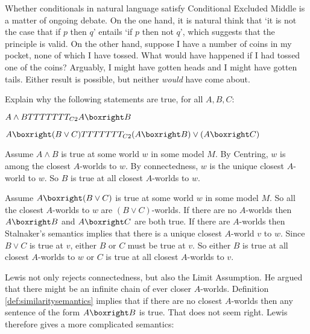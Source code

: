Whether conditionals in natural language satisfy Conditional Excluded Middle is
a matter of ongoing debate. On the one hand, it is natural think that `it is not
the case that if $p$ then $q$' entails `if $p$ then not $q$', which suggests
that the principle is valid. On the other hand, suppose I have a number of coins
in my pocket, none of which I have tossed. What would have happened if I had
tossed one of the coins? Arguably, I might have gotten heads and I might have
gotten tails. Either result is possible, but neither \emph{would} have come
about.

\begin{exercise}
  Explain why the following statements are true, for all $A,B,C$:
  \begin{exlist}
  \item $A \land B \models_{C2} A \boxright B$
  \item $A \boxright (B\lor C) \models_{C2} (A \boxright B) \lor (A \boxright C)$
  \end{exlist}
\end{exercise}
\begin{solution}
  \begin{sollist}
    \item Assume $A\land B$ is true at some world $w$ in some model $M$. By
    Centring, $w$ is among the closest $A$-worlds to $w$. By connectedness, $w$
    is the unique closest $A$-world to $w$. So $B$ is true at all closest
    $A$-worlds to $w$.
    \item Assume $A \boxright (B\lor C)$ is true at some world $w$ in some model
    $M$. So all the closest $A$-worlds to $w$ are $(B\lor C)$-worlds. If there
    are no $A$-worlds then $A \boxright B$ and $A \boxright C$ are both true. If
    there are $A$-worlds then Stalnaker's semantics implies that there is a
    unique closest $A$-world $v$ to $w$. Since $B\lor C$ is true at $v$, either $B$ or $C$ must be true at $v$. So either $B$ is true at all closest $A$-worlds to $w$ or $C$ is true at all closest $A$-worlds to $v$.
  \end{sollist}
\end{solution}

Lewis not only rejects connectedness, but also the Limit Assumption. He argued
that there might be an infinite chain of ever closer $A$-worlds. Definition
\ref{def:similaritysemantics} implies that if there are no closest $A$-worlds
then any sentence of the form $A \boxright B$ is true. That does not seem right.
Lewis therefore gives a more complicated semantics:

